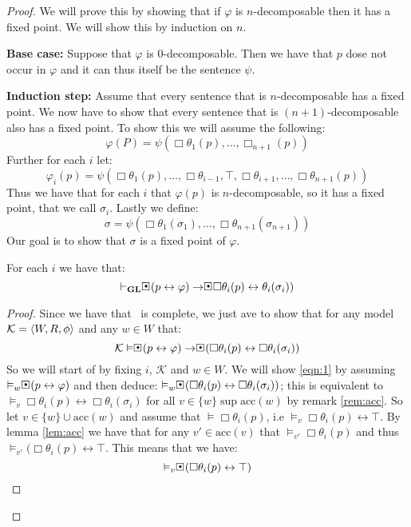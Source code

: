 \documentclass[../main.tex]{subfiles}
\begin{document}
\begin{proof}
	We will prove this by showing that if $\varphi$ is $n$-decomposable
	then it has a fixed point. We will show this by induction on $n$.

	\textbf{Base case:} Suppose that $\varphi$ is $0$-decomposable. Then we
	have that $p$ dose not occur in $\varphi$ and it can thus itself be the
	sentence $\psi$.

	\textbf{Induction step:}
	Assume that every sentence that is $n$-decomposable has a fixed point.
	We now have to show that every sentence that is $(n+1)$-decomposable
	also has a fixed point. To show this we will assume the following:
	$$\varphi(P)=\psi(\Box\theta_1(p),\ldots,\Box_{n+1}(p))$$
	Further for each $i$ let:
	$$\varphi_i(p)=\psi(\Box\theta_1(p),\ldots,\Box\theta_{i-1},\top,\Box\theta_{i+1},\ldots,\Box\theta_{n+1}(p))$$
	Thus we have that for each $i$ that $\varphi(p)$ is $n$-decomposable,
	so it has a fixed point, that we call $\sigma_i$. Lastly we define:
	$$\sigma=\psi(\Box\theta_1(\sigma_1),\ldots,\Box\theta_{n+1}(\sigma_{n+1}))$$
	Our goal is to show that $\sigma$ is a fixed point of $\varphi$.
	\begin{lem}
		\label{lem:fix}
		For each $i$ we have that:
		$$\vdash_\GL\sBox(p\leftrightarrow\varphi)\rightarrow\sBox\Box\theta_i(p)\leftrightarrow\theta_i(\sigma_i))$$
	\end{lem}
	\begin{proof}
		Since we have that \GL\ is complete, we just ave to show that
		for any model $\mathcal{K}=\langle W,R,\phi\rangle$ and any $w\in W$
		that:
		\begin{equation}
		\label{eqn:1}
			\mathcal{K}\vDash\sBox(p\leftrightarrow\varphi)\rightarrow\sBox(\Box\theta_i(p)\leftrightarrow
		\Box\theta_i(\sigma_i))
	\end{equation}
		So we will start of by fixing $i$, $\mathcal{K}$ and $w\in W$.
		We will show \ref{eqn:1} by assuming
		$\vDash_w\sBox(p\leftrightarrow\varphi)$ and then deduce:
		$\vDash_w\sBox(\Box\theta_i(p)\leftrightarrow\Box\theta_i(\sigma_i))$;
		this is equivalent to $\vDash_v\Box
		\theta_i(p)\leftrightarrow\Box\theta_i(\sigma_i)$ for all
		$v\in\{w\}\sup\text{acc}(w)$ by remark \ref{rem:acc}. So let
		$v\in\{w\}\cup\text{acc}(w)$ and assume that
		$\vDash\Box\theta_i(p)$, i.e
		$\vDash_v\Box\theta_i(p)\leftrightarrow\top$. By lemma
		\ref{lem:acc} we have that for any $v'\in\text{acc}(v)$ that
		$\vDash_{v'}\Box\theta_i(p)$ and thus
		$\vDash_{v'}(\Box\theta_i(p)\leftrightarrow\top$. This means
		that we have:
		$$\vDash_v\sBox(\Box\theta_i(p)\leftrightarrow\top)$$

\end{proof}
\end{proof}
\end{document}

